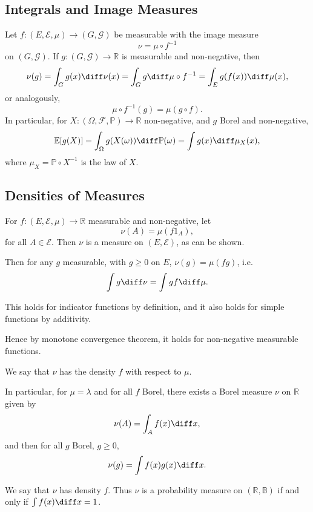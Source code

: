 \documentclass[12pt]{article}
\begin{document}
\subsection{Integrals and Image Measures}
\label{sub:ints_imgs}

Let $f : (E, \mathcal{E}, \mu) \to (G, \mathcal{G})$ be measurable with the image measure
\[
\nu = \mu \circ f^{-1}
\]
on $(G, \mathcal{G})$. If $g : (G, \mathcal{G}) \to \mathbb{R}$ is measurable and non-negative, then
\[
\nu(g) = \int_G g(x) \diff \nu(x) = \int_G g \diff \mu \circ f^{-1} = \int_E g(f(x)) \diff \mu(x),
\]
or analogously,
\[
\mu \circ f^{-1}(g) = \mu(g \circ f).
\]
In particular, for $X : (\Omega, \mathcal{F}, \mathbb{P}) \to \mathbb{R}$ non-negative, and $g$ Borel and non-negative,
\[
\mathbb{E}[g(X)] = \int_{\Omega} g(X(\omega)) \diff \mathbb{P}(\omega) = \int g(x) \diff \mu_X(x),
\]
where $\mu_X = \mathbb{P} \circ X^{-1}$ is the law of $X$.

\subsection{Densities of Measures}
\label{sub:dense_measure}

For $f : (E, \mathcal{E}, \mu) \to \mathbb{R}$ measurable and non-negative, let
\[
\nu(A) = \mu(f 1_A),
\]
for all $A \in \mathcal{E}$. Then $\nu$ is a measure on $(E, \mathcal{E})$, as can be shown.

Then for any $g$ measurable, with $g \geq 0$ on $E$, $\nu(g) = \mu(fg)$, i.e.
\[
\int g \diff \nu = \int g f \diff \mu.
\]

\begin{proofbox}
	This holds for indicator functions by definition, and it also holds for simple functions by additivity.

	Hence by monotone convergence theorem, it holds for non-negative measurable functions.
\end{proofbox}

We say that $\nu$ has the density $f$ with respect to $\mu$.

In particular, for $\mu = \lambda$ and for all $f$ Borel, there exists a Borel measure $\nu$ on $\mathbb{R}$ given by
\[
\nu(A) = \int_A f(x) \diff x,
\]
and then for all $g$ Borel, $g \geq 0$,
\[
\nu(g) = \int f(x) g(x) \diff x.
\]

We say that $\nu$ has density $f$. Thus $\nu$ is a probability measure on $(\mathbb{R}, \mathbb{B})$ if and only if $\int f(x) \diff x = 1$.
\end{document}
